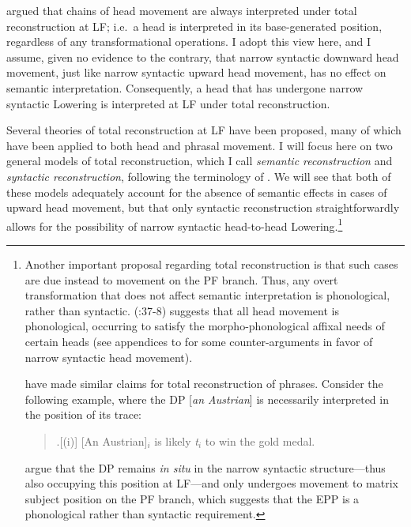 argued that chains of head movement are always interpreted under total reconstruction at LF; i.e.\ a head is interpreted in its base-generated position, regardless of any transformational operations. I adopt this view here, and I assume, given no evidence to the contrary, that narrow syntactic downward head movement, just like narrow syntactic upward head movement, has no effect on semantic interpretation. Consequently, a head that has undergone narrow syntactic Lowering is interpreted at LF under total reconstruction.

Several theories of total reconstruction at LF have been proposed, many of which have been applied to both head and phrasal movement. I will focus here on two general models of total reconstruction, which I call {\it semantic reconstruction} and {\it syntactic reconstruction}, following the terminology of \citet{fox_nissenbaum2004}. We will see that both of these models adequately account for the absence of semantic effects in cases of upward head movement, but that only syntactic reconstruction straightforwardly allows for the possibility of narrow syntactic head-to-head Lowering.\footnote{\label{sau_el_total_rec_fn}Another important proposal regarding total reconstruction is that such cases are due instead to movement on the PF branch. Thus, any overt transformation that does not affect semantic interpretation is phonological, rather than syntactic. \citeauthor{chomsky2001} (\citeyear{chomsky2001}:37-8) suggests that all head movement is phonological, occurring to satisfy the morpho-phonological affixal needs of certain heads (see appendices to  for some counter-arguments in favor of narrow syntactic head movement).

\citet{sauerland_elbourne2002} have made similar claims for total reconstruction of phrases. Consider the following example, where the DP [{\it an Austrian}] is necessarily interpreted in the position of its trace:

\begin{quote}
\ex.[(i)] [An Austrian]$_{i}$ is likely {\it t}$_{i}$ to win the gold medal.

\end{quote}
\citeauthor{sauerland_elbourne2002} argue that the DP remains {\it in situ} in the narrow syntactic structure---thus also occupying this position at LF---and only undergoes movement to matrix subject position on the PF branch, which suggests that the EPP is a phonological rather than syntactic requirement.

}
